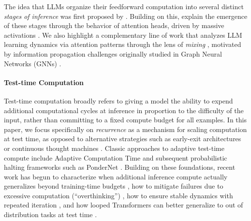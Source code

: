 The idea that LLMs organize their feedforward computation into several distinct \textit{stages of inference} was first proposed by \citet{lad2024remarkable}. Building on this, \citet{queipo2025attention} explain the emergence of these stages through the behavior of attention heads, driven by massive activations \citep{sun2024massive}. We also highlight a complementary line of work that analyzes LLM learning dynamics via attention patterns through the lens of \textit{mixing} \citep{barbero2024transformers, arroyo2026a, velivckovic2024softmax, barbero2025llms}, motivated by information propagation challenges originally studied in Graph Neural Networks (GNNs) \citep{cai2020note,alon2020bottleneck,arroyo2025vanishing,hariri2025return,blayney2025glstm}.

\paragraph{Test-time Computation}

Test-time computation broadly refers to giving a model the ability to expend additional computational cycles at inference in proportion to the difficulty of the input, rather than committing to a fixed compute budget for all examples. In this paper, we focus specifically on \emph{recurrence} as a mechanism for scaling computation at test time, as opposed to alternative strategies such as early-exit architectures \cite{schuster2022confident} or continuous thought machines \cite{darlow2025continuous}. Classic approaches to adaptive test-time compute include Adaptive Computation Time \cite{graves2016adaptive} and subsequent probabilistic halting frameworks such as PonderNet \cite{banino2021pondernet}. Building on these foundations, recent work has begun to characterize when additional inference compute actually generalizes beyond training-time budgets \cite{schwarzschild2021can}, how to mitigate failures due to excessive computation (``overthinking'') \citep{bansal2022end}, how to ensure stable dynamics with repeated iteration \citep{bear2024rethinking}, and how looped Transformers can better generalize to out of distribution tasks at test time \citep{mcleish2024transformers}.








